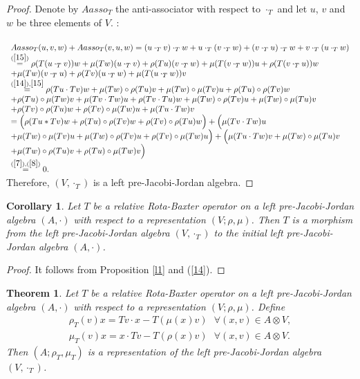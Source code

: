 \documentclass[12pt]{amsart}
\newtheorem{theorem}[Theorem]{Theorem}
\newtheorem{corollary}[Theorem]{Corollary}
\begin{document}
\begin{proof} Denote by $Aasso_T$ the anti-associator with respect to $\cdot_T$  and
	let $u$, $v$ and $ w $  be three elements of $ V $.  :\\
	\\
	$ \begin{array}{lll}
		Aasso_{T}(u,v,w)+ Aasso_{T}(v,u,w)=(u \cdot _{T} v)\cdot _{T}w+u \cdot _{T} (v\cdot _{T}w)+(v \cdot _{T} u)\cdot _{T}w+v \cdot _{T} (u\cdot _{T}w)\\
		\overset{(\ref{15})}{=}
		\rho(T(u\cdot_T v))w+\mu(Tw)(u\cdot_T v)+\rho(Tu)(v\cdot_T w)+\mu(T(v\cdot_T w))u+
		
		\rho(T(v\cdot_T u))w\\
		+\mu(Tw)(v\cdot_T u)+\rho(Tv)(u\cdot_T w)+\mu(T(u\cdot_T w))v
		\\
		\overset{(\ref{14}),\ref{15}}{=}\rho(Tu\cdot Tv)w+\mu(Tw)\circ\rho(Tu)v+\mu(Tw)\circ\mu(Tv)u+\rho(Tu)\circ\rho(Tv)w\\
		+\rho(Tu)\circ\mu(Tw)v+\mu(Tv\cdot Tw)u+\rho(Tv\cdot Tu)w+\mu(Tw)\circ\rho(Tv)u+\mu(Tw)\circ\mu(Tu)v\\
		+\rho(Tv)\circ\rho(Tu)w+\rho(Tv)\circ\mu(Tw)u+\mu(Tu\cdot Tw)v\\
		=\Big(\rho(Tu\ast Tv)w+\rho(Tu)\circ\rho(Tv)w+\rho(Tv)\circ\rho(Tu)w\Big)+\Big(\mu(Tv\cdot Tw)u\\
		+\mu(Tw)\circ\mu(Tv)u+\mu(Tw)\circ\rho(Tv)u+\rho(Tv)\circ\mu(Tw)u\Big)+\Big(\mu(Tu\cdot Tw)v+\mu(Tw)\circ\mu(Tu)v\\
		+\mu(Tw)\circ\rho(Tu)v+\rho(Tu)\circ\mu(Tw)v\Big)
		\\
		\overset{(\ref{7}),(\ref{8})}{=}0.
	\end{array} $\\
	Therefore, $ (V,\cdot _{T} ) $ is a left pre-Jacobi-Jordan algebra.
\end{proof}
\begin{corollary}
	Let $ T $ be a relative Rota-Baxter operator on a left pre-Jacobi-Jordan algebra $ (A,\cdot) $ with respect to a representation $ (V; \rho,\mu) $. Then $ T $ is a morphism from the left pre-Jacobi-Jordan algebra $ (V,\cdot_{T}) $ to the initial left pre-Jacobi-Jordan algebra $ (A,\cdot) $.  	
\end{corollary}	
\begin{proof}
	It follows from Proposition \ref{l1} and (\ref{14}).
\end{proof}
\begin{theorem}\label{Th1}
	Let $ T $ be a relative Rota-Baxter operator on a left pre-Jacobi-Jordan algebra $ (A,\cdot) $ with respect to a representation $ (V; \rho,\mu) $. Define 
	\begin{eqnarray}
		\label{29} 
		\rho_{T}(v)x=Tv\cdot x-T(\mu(x)v) \mbox{ $\forall (x,v)\in A\otimes V$},\\
		\label{30}
		\mu_{T}(v)x=x\cdot Tv-T(\rho(x)v) \mbox{ $\forall (x,v)\in A\otimes V.$}
	\end{eqnarray}
	Then $ (A; \rho_{T},\mu_{T}) $ is a representation of the left pre-Jacobi-Jordan algebra $ (V,\cdot_{T}) $. 
\end{theorem}
\end{document}
